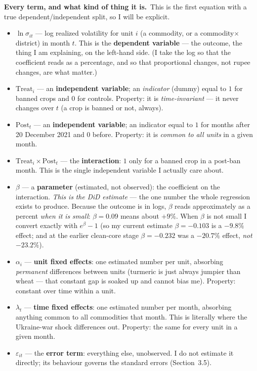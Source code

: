 \documentclass[11pt]{article}
\newcommand{\vars}{\smallskip\noindent\textbf{Every term, and what kind of thing it is.}\ }
\begin{document}
\vars This is the first equation with a true dependent/independent split, so I will be explicit.
\begin{itemize}
\item $\ln \sigma_{it}$ --- log realized volatility for unit $i$ (a commodity, or a
commodity$\times$district) in month $t$. This is the \textbf{dependent variable} --- the outcome,
the thing I am explaining, on the left-hand side. (I take the log so that the coefficient reads as
a percentage, and so that proportional changes, not rupee changes, are what matter.)
\item $\mathrm{Treat}_i$ --- an \textbf{independent variable}; an \emph{indicator} (dummy) equal to
$1$ for banned crops and $0$ for controls. Property: it is \emph{time-invariant} --- it never
changes over $t$ (a crop is banned or not, always).
\item $\mathrm{Post}_t$ --- an \textbf{independent variable}; an indicator equal to $1$ for months
after 20 December 2021 and $0$ before. Property: it is \emph{common to all units} in a given month.
\item $\mathrm{Treat}_i \times \mathrm{Post}_t$ --- the \textbf{interaction}: $1$ only for a banned
crop in a post-ban month. This is the single independent variable I actually care about.
\item $\beta$ --- a \textbf{parameter} (estimated, not observed): the coefficient on the
interaction. \emph{This is the DiD estimate} --- the one number the whole regression exists to
produce. Because the outcome is in logs, $\beta$ reads approximately as a percent \emph{when it is
small}: $\beta=0.09$ means about $+9\%$. When $\beta$ is not small I convert exactly with
$e^{\beta}-1$ (so my current estimate $\beta=-0.103$ is a $-9.8\%$ effect; and at the earlier
clean-core stage $\beta=-0.232$ was a $-20.7\%$ effect, \emph{not} $-23.2\%$).
\item $\alpha_i$ --- \textbf{unit fixed effects}: one estimated number per unit, absorbing
\emph{permanent} differences between units (turmeric is just always jumpier than wheat --- that
constant gap is soaked up and cannot bias me). Property: constant over time within a unit.
\item $\lambda_t$ --- \textbf{time fixed effects}: one estimated number per month, absorbing
anything common to all commodities that month. This is literally where the Ukraine-war shock
differences out. Property: the same for every unit in a given month.
\item $\varepsilon_{it}$ --- the \textbf{error term}: everything else, unobserved. I do not estimate
it directly; its behaviour governs the standard errors (Section~3.5).
\end{itemize}
\end{document}
